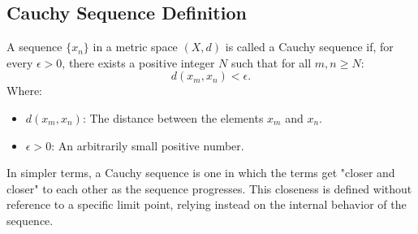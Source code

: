 \subsection{Cauchy Sequence Definition}
A sequence \( \{x_n\} \) in a metric space \( (X, d) \) is called a Cauchy sequence if, for every \( \epsilon > 0 \), there exists a positive integer \( N \) such that for all \( m, n \geq N \):
\[
d(x_m, x_n) < \epsilon.
\]
Where:
\begin{itemize}
    \item \( d(x_m, x_n) \): The distance between the elements \( x_m \) and \( x_n \).
    \item \( \epsilon > 0 \): An arbitrarily small positive number.
\end{itemize}

In simpler terms, a Cauchy sequence is one in which the terms get "closer and closer" to each other as the sequence progresses. This closeness is defined without reference to a specific limit point, relying instead on the internal behavior of the sequence.

